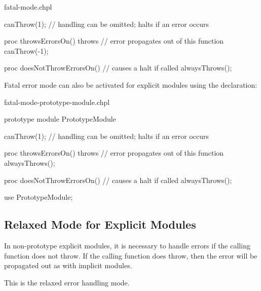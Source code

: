 \begin{chapelexample}{fatal-mode.chpl}
\begin{chapel}
canThrow(1); // handling can be omitted; halts if an error occurs

proc throwsErrorsOn() throws {
  // error propagates out of this function
  canThrow(-1);
}

proc doesNotThrowErrorsOn() {
  // causes a halt if called
  alwaysThrows();
}
\end{chapel}
\begin{chapelpost}
\end{chapelpost}
\begin{chapeloutput}
\end{chapeloutput}
\end{chapelexample}

Fatal error mode can also be activated for explicit modules using the
 declaration:

\begin{chapelexample}{fatal-mode-prototype-module.chpl}
\begin{chapel}
prototype module PrototypeModule {

  canThrow(1); // handling can be omitted; halts if an error occurs

  proc throwsErrorsOn() throws {
    // error propagates out of this function
    alwaysThrows();
  }

  proc doesNotThrowErrorsOn() {
    // causes a halt if called
    alwaysThrows();
  }
}

use PrototypeModule;
\end{chapel}
\begin{chapelpost}
\end{chapelpost}
\begin{chapeloutput}
\end{chapeloutput}
\end{chapelexample}

\subsection{Relaxed Mode for Explicit Modules}
\label{Relaxed_Mode_for_Explicit_Modules}

In non-prototype explicit modules, it is necessary to handle errors if the
calling function does not throw. If the calling function does
throw, then the error will be propagated out as with implicit modules.

This is the relaxed error handling mode.

